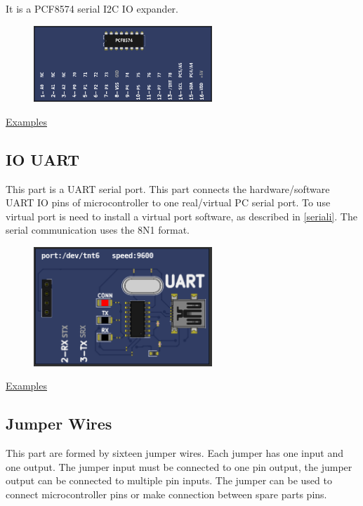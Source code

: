 It is a PCF8574 serial I2C IO expander.

\begin{figure}[H]
\center
\includegraphics[width=0.6\textwidth]{img/part_pcf8574.png} 
\end{figure} 

\href{https://lcgamboa.github.io/picsimlab_examples/Parts.html\#IO_PCF8574}{Examples}


\subsection{IO UART}

This part is a UART serial port. This part connects the hardware/software UART IO pins of microcontroller to
one real/virtual PC serial port. To use virtual port is need to install a virtual port software, as described in \ref{seriali}. 
The serial communication uses the 8N1 format.

\begin{figure}[H]
\center
\includegraphics[width=0.6\textwidth]{img/part_uart.png} 
\end{figure} 

\href{https://lcgamboa.github.io/picsimlab_examples/Parts.html\#IO_UART}{Examples}


\subsection{Jumper Wires}

This part are formed by sixteen jumper wires. Each jumper has one input and one output.  The jumper input must be connected to one pin output, 
the jumper output can be connected to multiple pin inputs. The jumper can be used to connect microcontroller pins or make connection between 
spare parts pins.   

